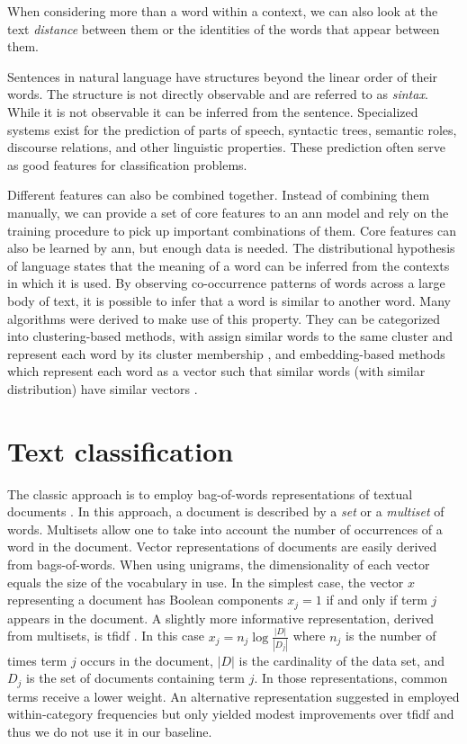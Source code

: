 When considering more than a word within a context, we can also look
at the text \emph{distance} between them or the identities of the
words that appear between them.

Sentences in natural language have structures beyond the linear order
of their words. The structure is not directly observable and are
referred to as \emph{sintax}. While it is not observable it can be
inferred from the sentence. Specialized systems exist for the
prediction of parts of speech, syntactic trees, semantic roles,
discourse relations, and other linguistic properties. These prediction
often serve as good features for classification problems.

Different features can also be combined together. Instead of combining
them manually, we can provide a set of core features to an \ac{ann}
model and rely on the training procedure to pick up important
combinations of them.
Core features can also be learned by \ac{ann}, but enough data is
needed. The distributional hypothesis of language states that the
meaning of a word can be inferred from the contexts in which it is
used. By observing co-occurrence patterns of words across a large body
of text, it is possible to infer that a word is similar to another
word. Many algorithms were derived to make use of this property. They
can be categorized into clustering-based methods, with assign similar
words to the same cluster and represent each word by its cluster
membership \cite{miller2004name}, and embedding-based methods which
represent each word as a 
vector such that similar words (with similar distribution) have
similar vectors \cite{pennington_glove:_2014,mikolov_linguistic_2013}.

\section{Text classification}
\label{sec-baselines}
The classic approach is to employ bag-of-words
representations of textual documents
\cite{manning_introduction_2008}. In this approach, a document is 
described by a \textit{set} or a \textit{multiset} of words.
Multisets allow one to take into account the number of occurrences of
a word in the document. Vector representations of documents are easily
derived from bags-of-words. When using unigrams, the dimensionality of
each vector equals the size of the vocabulary in use. In the simplest
case, the vector $x$ representing a document has Boolean components
$x_j=1$ if and only if term $j$ appears in the document. A slightly more
informative representation, derived from multisets, is \ac{tfidf}
\cite{manning_introduction_2008}. In this case 
$x_j=n_j\log \frac{|D|}{|D_j|}$ where $n_j$ is the number of times
term $j$ occurs in the document, $|D|$ is the cardinality of the
data set, and $D_j$ is the set of documents containing term $j$. In
those representations, common terms receive a lower weight. An
alternative representation suggested in
\cite{martinez_information_2011} employed within-category frequencies
but only yielded modest improvements over \ac{tfidf} and thus we do not
use it in our baseline.


